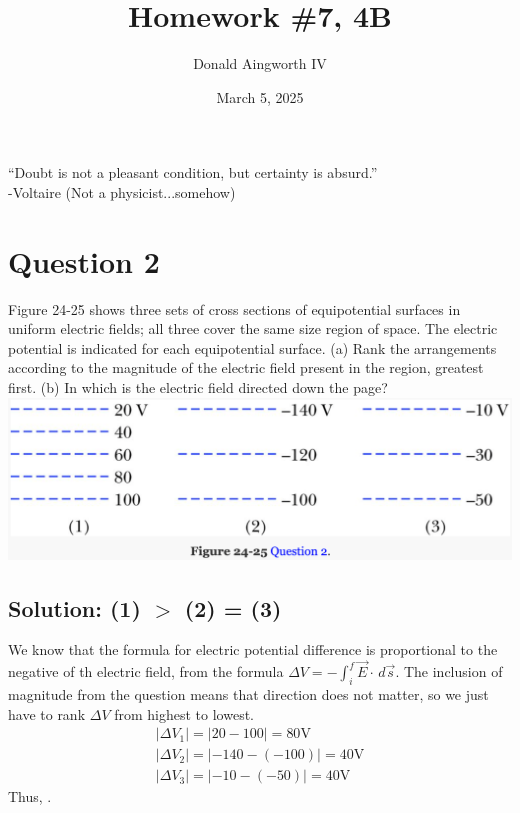 \documentclass[12pt]{article}
\title{Homework \#7, 4B}
\author{Donald Aingworth IV}
\date{March 5, 2025}
\begin{document}

\maketitle

\vfill

\begin{center}
    ``Doubt is not a pleasant condition, but certainty is absurd.'' \\-Voltaire (Not a physicist...somehow)
\end{center}
\pagebreak

\section{Question 2}
Figure 24-25 shows three sets of cross sections of equipotential surfaces in uniform electric fields; all three cover the same size region of space. The electric potential is indicated for each equipotential surface. (a) Rank the arrangements according to the magnitude of the electric field present in the region, greatest first. (b) In which is the electric field directed down the
page?\\
\includegraphics[width=\textwidth]{picture_1.png}

\subsection{Solution: (1) $>$ (2) = (3)}
We know that the formula for electric potential difference is proportional to the negative of th electric field, from the formula $\Delta V = -\int_i^f \vec{E}\cdot\,d\vec{s}$.
The inclusion of magnitude from the question means that direction does not matter, so we just have to rank $\Delta V$ from highest to lowest.
\begin{gather*}
    \left|\Delta V_1\right| = \left| 20 - 100 \right| = 80 \unit{\volt}\\
    \left|\Delta V_2\right| = \left| -140 - (-100) \right| = 40 \unit{\volt}\\
    \left|\Delta V_3\right| = \left| -10 - (-50) \right| = 40 \unit{\volt}
\end{gather*}
Thus, .
\end{document}
